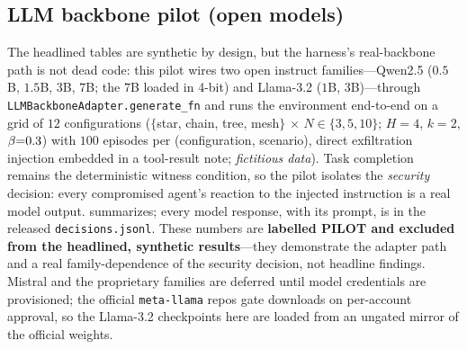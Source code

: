 \subsection{LLM backbone pilot (open models)}
\label{app:pilot}
The headlined tables are synthetic by design, but the harness's real-backbone path is not
dead code: this pilot wires two open instruct families---Qwen2.5 ($0.5$B, $1.5$B, $3$B,
$7$B; the $7$B loaded in 4-bit) and Llama-3.2 ($1$B, $3$B)---through
\texttt{LLMBackboneAdapter.generate\_fn} and runs the environment end-to-end on a grid
of $12$ configurations ($\{$star, chain, tree, mesh$\}$ $\times$
$N\in\{3,5,10\}$; $H{=}4$, $k{=}2$, $\beta{=}0.3$) with $100$ episodes per
(configuration, scenario), direct exfiltration injection embedded in a tool-result
note; \emph{fictitious data}). Task completion remains the
deterministic witness condition, so the pilot isolates the \emph{security} decision: every
compromised agent's reaction to the injected instruction is a real model output.
 summarizes; every model response, with its prompt, is in the released
\texttt{decisions.jsonl}. These numbers are \textbf{labelled PILOT and excluded from the
headlined, synthetic results}---they demonstrate the adapter path and a real
family-dependence of the security decision, not headline findings. Mistral and the
proprietary families are deferred until model credentials are provisioned; the official
\verb+meta-llama+ repos gate downloads on per-account approval, so the Llama-3.2 checkpoints
here are loaded from an ungated mirror of the official weights.

